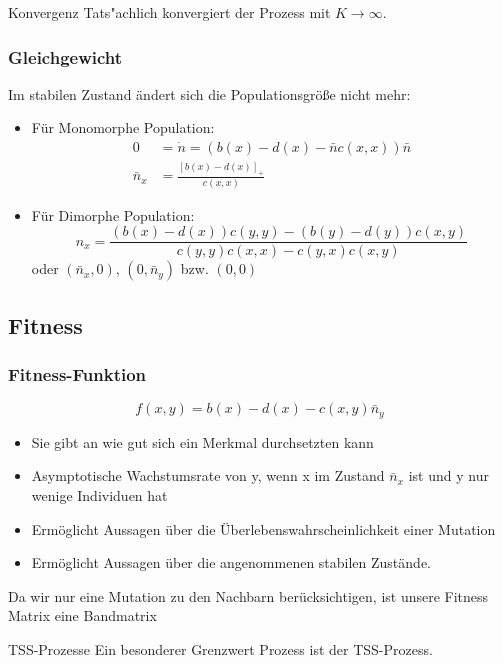 \documentclass{beamer}
\begin{document}
\begin{frame}{Konvergenz}
	Tats"achlich konvergiert der Prozess mit $ K \to \infty $.
\end{frame}

\begin{frame}
	\frametitle{Gleichgewicht}
	Im stabilen Zustand ändert sich die Populationsgröße nicht mehr:
	\pause
	\begin{itemize}
		\item Für Monomorphe Population:
			\begin{align*}
			0 & = \dot{n} = (b(x) - d(x) - \bar{n}c(x,x))\bar{n}\\
			\bar{n}_x &= \frac{\left[ b(x)-d(x) \right]_+}{c(x,x)}
			\end{align*}
			\pause
		\item Für Dimorphe Population:
			\[ n_x = \frac{(b(x) - d(x))c(y,y)-(b(y)-d(y))c(x,y)}{c(y,y)c(x,x) - c(y,x)c(x,y)} \]
			oder $ (\bar{n}_x, 0)$, $ (0, \bar{n}_y)$ bzw. $ (0,0) $
	\end{itemize}
\end{frame}

\subsection{Fitness}
\begin{frame}
	\frametitle{Fitness-Funktion}
	\[ f(x,y) = b(x) - d(x) - c(x,y)\bar{n}_y \]\pause
	\begin{itemize}
		\item Sie gibt an wie gut sich ein Merkmal durchsetzten kann
		\item Asymptotische Wachstumsrate von y, wenn x im Zustand $ \bar{n}_x $ ist und y nur wenige Individuen hat
		\item Ermöglicht Aussagen über die Überlebenswahrscheinlichkeit einer Mutation
		\item Ermöglicht Aussagen über die angenommenen stabilen Zustände.
	\end{itemize}
	\pause
	Da wir nur eine Mutation zu den Nachbarn berücksichtigen, ist unsere Fitness Matrix eine Bandmatrix
\end{frame}

\begin{frame}{TSS-Prozesse}
	Ein besonderer Grenzwert Prozess ist der TSS-Prozess.
\end{frame}
\end{document}
